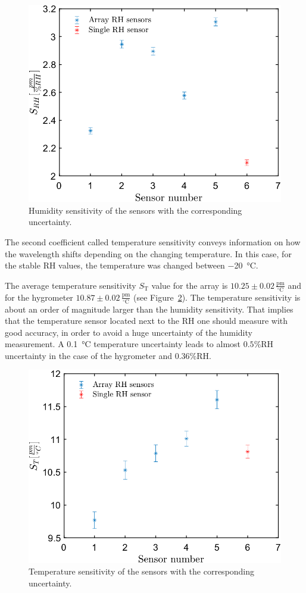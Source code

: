 \begin{figure}[!h]
\centering
\includegraphics[width=0.6\columnwidth]{Chapter5/images/comp1.png}
\caption{Humidity sensitivity of the sensors with the corresponding uncertainty.}
\label{fig_calibration}
\end{figure}
\newpage
The second coefficient called temperature sensitivity conveys information on how the wavelength shifts depending on the changing temperature. In this case, for the stable \gls{RH} values, the temperature was changed between \SI{-20}{\celsius}.

The average temperature sensitivity $S_\text{T}$ value for the array is $10.25\pm0.02\,\mathrm{\frac{pm}{^{\circ}C}}$ and for the hygrometer $10.87\pm 0.02\,\mathrm{\frac{pm}{^{\circ}C}}$ (see Figure~\ref{fig_calibration1}). The temperature sensitivity is about an order of magnitude larger than the humidity sensitivity. That implies that the temperature sensor located next to the \gls{RH} one should measure with good accuracy, in order to avoid a huge uncertainty of the humidity measurement. A \SI{0.1}{\celsius} temperature uncertainty leads to almost $0.5$\%RH uncertainty in the case of the hygrometer and $0.36$\%RH. 
\begin{figure}[!h]
\centering
\includegraphics[width=0.6\columnwidth]{Chapter5/images/comp.png}
\caption{Temperature sensitivity of the sensors with the corresponding uncertainty.}
\label{fig_calibration1}
\end{figure}

